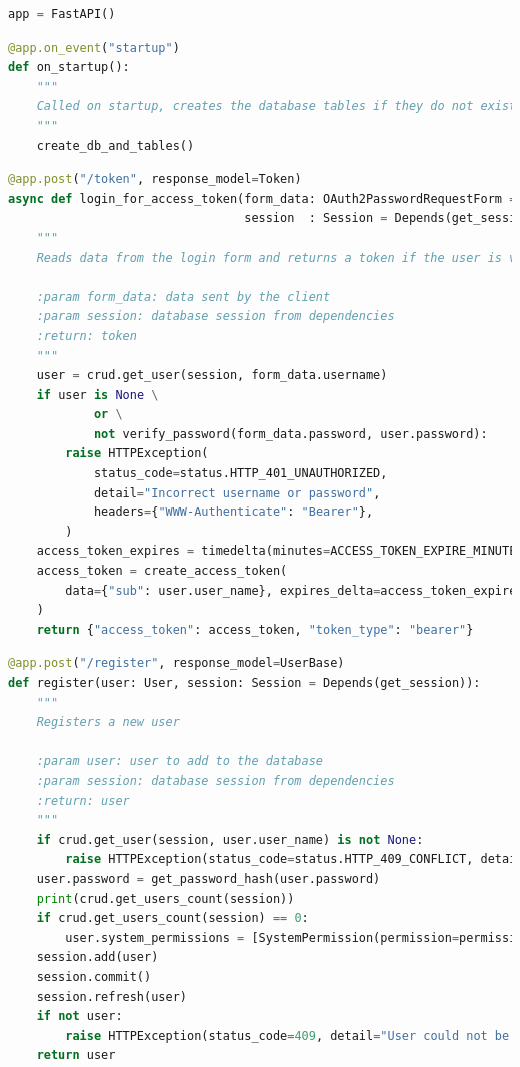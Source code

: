 \documentclass[12pt]{report}
\begin{document}
\begin{lstlisting}[language=Python, caption=App instance]
app = FastAPI()
\end{lstlisting}

\begin{lstlisting}[language=Python, caption=Set up the database on startup]
@app.on_event("startup")
def on_startup():
    """
    Called on startup, creates the database tables if they do not exist
    """
    create_db_and_tables()
\end{lstlisting}

\begin{lstlisting}[language=Python, caption=Login for access token]
@app.post("/token", response_model=Token)
async def login_for_access_token(form_data: OAuth2PasswordRequestForm = Depends(),
                                 session  : Session = Depends(get_session)):
    """
    Reads data from the login form and returns a token if the user is valid

    :param form_data: data sent by the client
    :param session: database session from dependencies
    :return: token
    """
    user = crud.get_user(session, form_data.username)
    if user is None \
            or \
            not verify_password(form_data.password, user.password):
        raise HTTPException(
            status_code=status.HTTP_401_UNAUTHORIZED,
            detail="Incorrect username or password",
            headers={"WWW-Authenticate": "Bearer"},
        )
    access_token_expires = timedelta(minutes=ACCESS_TOKEN_EXPIRE_MINUTES)
    access_token = create_access_token(
        data={"sub": user.user_name}, expires_delta=access_token_expires
    )
    return {"access_token": access_token, "token_type": "bearer"}
\end{lstlisting}

\begin{lstlisting}[language=Python, caption=Register user]
@app.post("/register", response_model=UserBase)
def register(user: User, session: Session = Depends(get_session)):
    """
    Registers a new user

    :param user: user to add to the database
    :param session: database session from dependencies
    :return: user
    """
    if crud.get_user(session, user.user_name) is not None:
        raise HTTPException(status_code=status.HTTP_409_CONFLICT, detail="User could not be registered")
    user.password = get_password_hash(user.password)
    print(crud.get_users_count(session))
    if crud.get_users_count(session) == 0:
        user.system_permissions = [SystemPermission(permission=permission) for permission in SysPermissions]
    session.add(user)
    session.commit()
    session.refresh(user)
    if not user:
        raise HTTPException(status_code=409, detail="User could not be registered")
    return user
\end{lstlisting}
\end{document}
